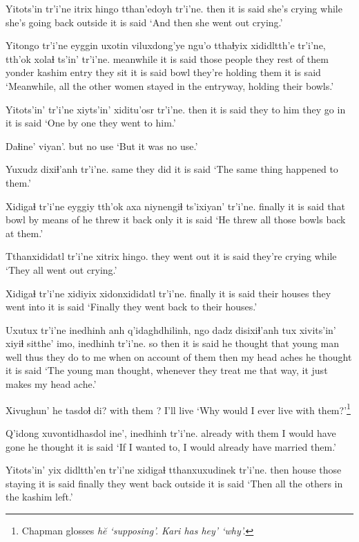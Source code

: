 \documentclass[12pt]{article}
\begin{document}
\gll Yitots'in tr'i'ne itrix   hingo tthan'edoyh tr'i'ne.
then  {it is said} {she's crying} while {she's going back outside} {it is said}
\glt `And then she went out crying.'
\glend

\gll Yitongo tr'i'ne eyggin uxotin  viluxdong'ye  ngu'o   tthaɬyix xididltth'e tr'i'ne, tth'ok xolaɬ ts'in'  tr'i'ne.
meanwhile {it is said} {those people} they {rest of them} yonder {kashim entry} {they sit} {it is said} bowl {they're holding them} {} {it is said}
\glt `Meanwhile, all the other women stayed in the entryway, holding their bowls.'
\glend

\gll Yitots'in' tr'i'ne xiyts'in' xiditu'osr   tr'i'ne.
then  {it is said} {they to him} {they go in} {it is said}
\glt `One by one they went to him.'
\glend

\gll Daɬine' viyan'.
but  {no use}
\glt `But it was no use.'
\glend

\gll Yuxudz dixiɬ'anh tr'i'ne.
same {they did} {it is said}
\glt `The same thing happened to them.'
\glend

\gll Xidigaɬ tr'i'ne eyggiy tth'ok axa niynengiɬ  ts'ixiyan' tr'i'ne.
finally  {it is said} that bowl {by means of} {he threw it back} only  {it is said}
\glt `He threw all those bowls back at them.'
\glend

\gll Tthanxididatl tr'i'ne xitrix   hingo.
{they went out} {it is said} {they're crying} while
\glt `They all went out crying.'
\glend

\gll Xidigaɬ tr'i'ne xidiyix xidonxididatl tr'i'ne.
finally  {it is said} {their houses} {they went into} {it is said}
\glt `Finally they went back to their houses.'
\glend

\gll Uxutux tr'i'ne inedhinh anh q'idaghdhilinh, ngo dadz disixiɬ'anh  tux  xivits'in'  xiyiɬ sitthe' imo,  inedhinh tr'i'ne.
{so then} {it is said} {he thought} that {young man} well thus {they do to me} when {on account of them} then {my head} aches {he thought} {it is said}
\glt `The young man thought, whenever they treat me that way, it just makes my head ache.'
\glend

\gll Xivughun' he tasdoɬ di?
{with them} ? {I'll live} {}
\glt `Why would I ever live with them?'\footnote{Chapman glosses \em h\u{e} \em `supposing'. Kari has \em hey' \em `why'.}
\glend
 
\gll Q'idong {xuvontidhasdol ine',} inedhinh tr'i'ne.
already {with them} {I would have gone} {he thought} {it is said}
\glt `If I wanted to, I would already have married them.'
\glend

\gll Yitots'in' yix didltth'en tr'i'ne xidigaɬ tthanxuxudinek tr'i'ne.
then  house {those staying} {it is said} finally {they went back outside} {it is said}
\glt `Then all the others in the kashim left.'
\glend
\end{document}
